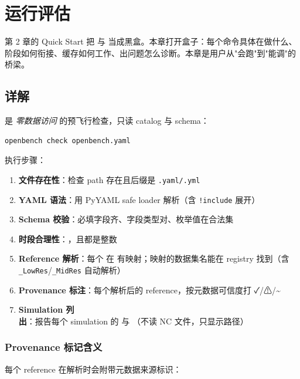 
\chapter{运行评估}

第 2 章的 Quick Start 把  与  当成黑盒。本章打开盒子：每个命令具体在做什么、阶段如何衔接、缓存如何工作、出问题怎么诊断。本章是用户从"会跑"到"能调"的桥梁。

\section{ 详解}

 是 \emph{零数据访问} 的预飞行检查，只读 catalog 与 schema：

\begin{verbatim}
openbench check openbench.yaml
\end{verbatim}

执行步骤：

\begin{enumerate}
  \item \textbf{文件存在性}：检查 path 存在且后缀是 \texttt{.yaml/.yml}
  \item \textbf{YAML 语法}：用 PyYAML safe loader 解析（含 \texttt{!include} 展开）
  \item \textbf{Schema 校验}：必填字段齐、字段类型对、枚举值在合法集
  \item \textbf{时段合理性}：，且都是整数
  \item \textbf{Reference 解析}：每个  在  有映射；映射的数据集名能在 registry 找到（含 \texttt{\_LowRes}/\texttt{\_MidRes} 自动解析）
  \item \textbf{Provenance 标注}：每个解析后的 reference，按元数据可信度打 ✓/⚠/\textasciitilde
  \item \textbf{Simulation 列出}：报告每个 simulation 的  与 （不读 NC 文件，只显示路径）
\end{enumerate}

\subsection{Provenance 标记含义}

每个 reference 在解析时会附带元数据来源标识：

